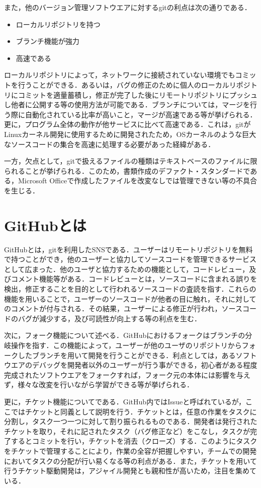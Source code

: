 \documentclass[a4paper,9pt,twocolumn]{jsarticle}
\begin{document}
また，他のバージョン管理ソフトウエアに対するgitの利点は次の通りである．

\begin{itemize}
\item ローカルリポジトリを持つ
\item ブランチ機能が強力
\item 高速である
\end{itemize}

ローカルリポジトリによって，ネットワークに接続されていない環境でもコミットを行うことができる．あるいは，バグの修正のために個人のローカルリポジトリにコミットを適量蓄積し，修正が完了した後にリモートリポジトリにプッシュし他者に公開する等の使用方法が可能である．ブランチについては，マージを行う際に自動化されている比率が高いこと，マージが高速である等が挙げられる．更に，プログラム全体の動作が他サービスに比べて高速である．これは，gitがLinuxカーネル開発に使用するために開発されたため，OSカーネルのような巨大なソースコードの集合を高速に処理する必要があった経緯がある．

一方，欠点として，gitで扱えるファイルの種類はテキストベースのファイルに限られることが挙げられる．このため，書類作成のデファクト・スタンダードである，Microsoft Officeで作成したファイルを改変なしでは管理できない等の不具合を生じる．

\section{GitHubとは}
GitHubとは，gitを利用したSNSである．ユーザーはリモートリポジトリを無料で持つことができ，他のユーザーと協力してソースコードを管理できるサービスとして広まった．他のユーザと協力するための機能として，コードレビュー，及びコメント機能等がある．コードレビューとは，ソースコードに含まれる誤りを検出，修正することを目的として行われるソースコードの査読を指す．これらの機能を用いることで，ユーザーのソースコードが他者の目に触れ，それに対してのコメントが付与される．その結果，ユーザーによる修正が行われ，ソースコードのバグが減少する，及び可読性が向上する等の利点を生む．

次に，フォーク機能について述べる．GitHubにおけるフォークはブランチの分岐操作を指す．この機能によって，ユーザーが他のユーザのリポジトリからフォークしたブランチを用いて開発を行うことができる．利点としては，あるソフトウエアのデバッグを開発者以外のユーザーが行う事ができる，初心者がある程度完成されたソフトウエアをフォークすれば，フォーク元の本体には影響を与えず，様々な改変を行いながら学習ができる等が挙げられる．

更に，チケット機能についてである．GitHub内ではIssueと呼ばれているが，ここではチケットと同義として説明を行う．チケットとは，任意の作業をタスクに分割し，タスク一つ一つに対して割り振られるものである．開発者は発行されたチケットを取り，それに記されたタスク（バグ修正など）をこなし，タスクが完了するとコミットを行い，チケットを消去（クローズ）する．このようにタスクをチケットで管理することにより，作業の全容が把握しやすい，チームでの開発においてタスクの分配が行い易くなる等の利点がある．また，チケットを用いて行うチケット駆動開発は，アジャイル開発とも親和性が高いため，注目を集めている．
\end{document}
